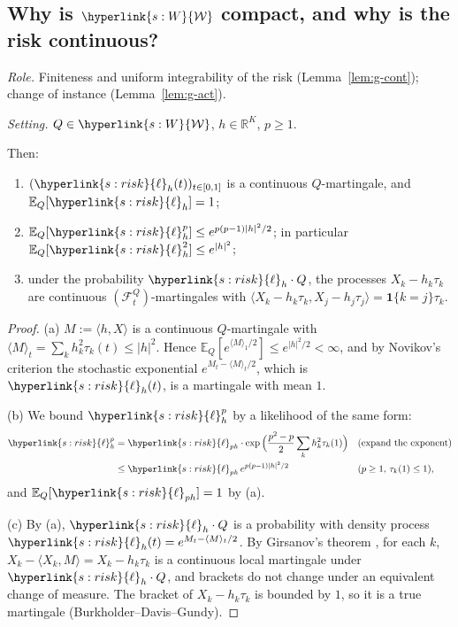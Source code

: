 \documentclass[11pt]{article}
\DeclareRobustCommand{\sy}[2]{{\hyperlink{#1}{#2}}}
\newcommand{\R}{\mathbb{R}}
\newcommand{\E}{\mathbb{E}}
\newcommand{\1}{\mathbf{1}}
\newcommand{\Wc}{\sy{s:W}{\mathcal W}}
\newcommand{\lh}{\sy{s:risk}{\ell}}
\begin{document}
\subsection{Why is $\Wc$ compact, and why is the risk continuous?}\label{sec:app-g-compact}

\begin{lemma}[likelihoods]\label{lem:g-like}
\textit{Role.} Finiteness and uniform integrability of the risk (Lemma~\ref{lem:g-cont}); change of instance (Lemma~\ref{lem:g-act}).

\noindent\textit{Setting.} $Q\in\Wc$, $h\in\R^K$, $p\ge1$.

\noindent Then:
\begin{enumerate}
\item[(a)] $(\lh_h(t))_{t\in[0,1]}$ is a continuous $Q$-martingale, and $\E_Q[\lh_h]=1$;
\item[(b)] $\E_Q[\lh_h^p]\le e^{p(p-1)|h|^2/2}$; in particular $\E_Q[\lh_h^2]\le e^{|h|^2}$;
\item[(c)] under the probability $\lh_h\cdot Q$, the processes $X_k-h_k\tau_k$ are continuous $(\mathcal F^Q_t)$-martingales with
$\langle X_k-h_k\tau_k,X_j-h_j\tau_j\rangle=\1\{k=j\}\tau_k$.
\end{enumerate}
\end{lemma}
\begin{proof}
(a) $M:=\langle h,X\rangle$ is a continuous $Q$-martingale with $\langle M\rangle_t=\sum_kh_k^2\tau_k(t)\le|h|^2$. Hence $\E_Q[e^{\langle M\rangle_1/2}]\le e^{|h|^2/2}<\infty$,
and by Novikov's criterion \citep[Cor.~3.5.13]{KS91} the stochastic exponential $e^{M_t-\langle M\rangle_t/2}$, which is $\lh_h(t)$, is a martingale with mean $1$.

(b) We bound $\lh_h^p$ by a likelihood of the same form:
\begin{align*}
\lh_h^p&=\lh_{ph}\cdot\exp\Big(\frac{p^2-p}2\sum_kh_k^2\tau_k(1)\Big) &&\text{(expand the exponent)}\\
&\le\lh_{ph}\,e^{p(p-1)|h|^2/2} &&\text{(}p\ge1\text{, }\tau_k(1)\le1\text{)},
\end{align*}
and $\E_Q[\lh_{ph}]=1$ by (a).

(c) By (a), $\lh_h\cdot Q$ is a probability with density process $\lh_h(t)=e^{M_t-\langle M\rangle_t/2}$. By Girsanov's theorem \citep[Thm~VIII.1.4]{RY99}, for each $k$,
$X_k-\langle X_k,M\rangle=X_k-h_k\tau_k$ is a continuous local martingale under $\lh_h\cdot Q$, and brackets do not change under an equivalent change of measure. The
bracket of $X_k-h_k\tau_k$ is bounded by $1$, so it is a true martingale (Burkholder--Davis--Gundy).
\end{proof}
\end{document}

